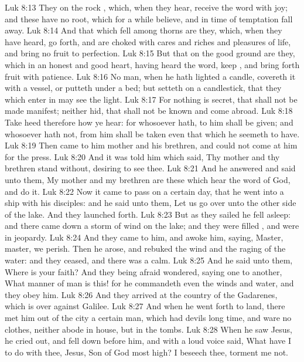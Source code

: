 \vs Luk 8:13 They on the rock , which, when they hear, receive the word with joy; and these have no root, which for a while believe, and in time of temptation fall away.
\vs Luk 8:14 And that which fell among thorns are they, which, when they have heard, go forth, and are choked with cares and riches and pleasures of  life, and bring no fruit to perfection.
\vs Luk 8:15 But that on the good ground are they, which in an honest and good heart, having heard the word, keep , and bring forth fruit with patience.
\vs Luk 8:16 No man, when he hath lighted a candle, covereth it with a vessel, or putteth  under a bed; but setteth  on a candlestick, that they which enter in may see the light.
\vs Luk 8:17 For nothing is secret, that shall not be made manifest; neither  hid, that shall not be known and come abroad.
\vs Luk 8:18 Take heed therefore how ye hear: for whosoever hath, to him shall be given; and whosoever hath not, from him shall be taken even that which he seemeth to have.
\vs Luk 8:19 Then came to him  mother and his brethren, and could not come at him for the press.
\vs Luk 8:20 And it was told him  which said, Thy mother and thy brethren stand without, desiring to see thee.
\vs Luk 8:21 And he answered and said unto them, My mother and my brethren are these which hear the word of God, and do it.
\vs Luk 8:22 Now it came to pass on a certain day, that he went into a ship with his disciples: and he said unto them, Let us go over unto the other side of the lake. And they launched forth.
\vs Luk 8:23 But as they sailed he fell asleep: and there came down a storm of wind on the lake; and they were filled , and were in jeopardy.
\vs Luk 8:24 And they came to him, and awoke him, saying, Master, master, we perish. Then he arose, and rebuked the wind and the raging of the water: and they ceased, and there was a calm.
\vs Luk 8:25 And he said unto them, Where is your faith? And they being afraid wondered, saying one to another, What manner of man is this! for he commandeth even the winds and water, and they obey him.
\vs Luk 8:26 And they arrived at the country of the Gadarenes, which is over against Galilee.
\vs Luk 8:27 And when he went forth to land, there met him out of the city a certain man, which had devils long time, and ware no clothes, neither abode in  house, but in the tombs.
\vs Luk 8:28 When he saw Jesus, he cried out, and fell down before him, and with a loud voice said, What have I to do with thee, Jesus,  Son of God most high? I beseech thee, torment me not.
